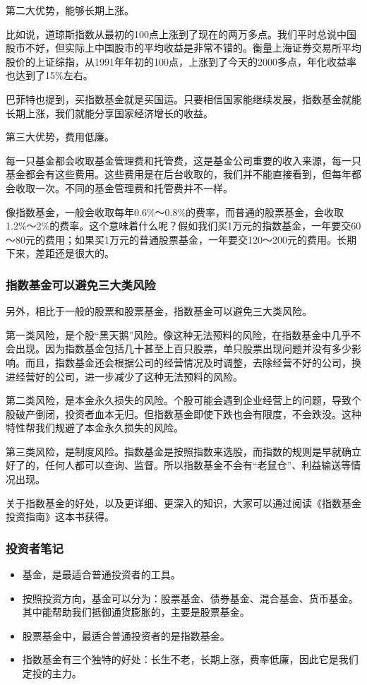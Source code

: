 第二大优势，能够长期上涨。

比如说，道琼斯指数从最初的100点上涨到了现在的两万多点。我们平时总说中国股市不好，但实际上中国股市的平均收益是非常不错的。衡量上海证券交易所平均股价的上证综指，从1991年年初的100点，上涨到了今天的2000多点，年化收益率也达到了15\%左右。

巴菲特也提到，买指数基金就是买国运。只要相信国家能继续发展，指数基金就能长期上涨，我们就能分享国家经济增长的收益。

第三大优势，费用低廉。

每一只基金都会收取基金管理费和托管费，这是基金公司重要的收入来源，每一只基金都会有这些费用。这些费用是在后台收取的，我们并不能直接看到，但每年都会收取一次。不同的基金管理费和托管费并不一样。

像指数基金，一般会收取每年0.6\%～0.8\%的费率，而普通的股票基金，会收取1.2\%～2\%的费率。这个意味着什么呢？假如我们买1万元的指数基金，一年要交60～80元的费用；如果买1万元的普通股票基金，一年要交120～200元的费用。长期下来，差距还是很大的。

\subsubsection{指数基金可以避免三大类风险}

另外，相比于一般的股票和股票基金，指数基金可以避免三大类风险。

第一类风险，是个股“黑天鹅”风险。像这种无法预料的风险，在指数基金中几乎不会出现。因为指数基金包括几十甚至上百只股票，单只股票出现问题并没有多少影响。而且，指数基金还会根据公司的经营情况及时调整，去除经营不好的公司，换进经营好的公司，进一步减少了这种无法预料的风险。

第二类风险，是本金永久损失的风险。个股可能会遇到企业经营上的问题，导致个股破产倒闭，投资者血本无归。但指数基金即使下跌也会有限度，不会跌没。这种特性帮我们规避了本金永久损失的风险。

第三类风险，是制度风险。指数基金是按照指数来选股，而指数的规则是早就确立好了的，任何人都可以查询、监督。所以指数基金不会有“老鼠仓”、利益输送等情况出现。

关于指数基金的好处，以及更详细、更深入的知识，大家可以通过阅读《指数基金投资指南》这本书获得。

\subsubsection{投资者笔记}

\begin{itemize}
\item {\kaishu 基金，是最适合普通投资者的工具。}
\item {\kaishu 按照投资方向，基金可以分为：股票基金、债券基金、混合基金、货币基金。其中能帮助我们抵御通货膨胀的，主要是股票基金。}
\item {\kaishu 股票基金中，最适合普通投资者的是指数基金。}
\item {\kaishu 指数基金有三个独特的好处：长生不老，长期上涨，费率低廉，因此它是我们定投的主力。}
\end{itemize}

